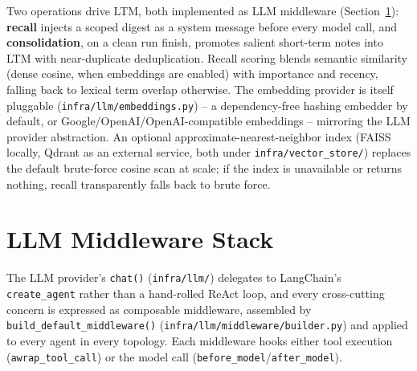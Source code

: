 \documentclass[conference]{IEEEtran}
\begin{document}
Two operations drive LTM, both implemented as LLM middleware
(Section~\ref{sec:middleware}): \textbf{recall} injects a scoped digest as
a system message before every model call, and \textbf{consolidation}, on a
clean run finish, promotes salient short-term notes into LTM with
near-duplicate deduplication. Recall scoring blends semantic similarity
(dense cosine, when embeddings are enabled) with importance and
recency, falling back to lexical term overlap otherwise. The embedding
provider is itself pluggable (\texttt{infra/llm/embeddings.py}) -- a
dependency-free hashing embedder by default, or Google/OpenAI/OpenAI-compatible
embeddings -- mirroring the LLM provider abstraction. An optional
approximate-nearest-neighbor index (FAISS locally, Qdrant as an external
service, both under \texttt{infra/vector\_store/}) replaces the default
brute-force cosine scan at scale; if the index is unavailable or returns
nothing, recall transparently falls back to brute force.

\section{LLM Middleware Stack}
\label{sec:middleware}

The LLM provider's \texttt{chat()} (\texttt{infra/llm/}) delegates to
LangChain's \texttt{create\_agent} rather than a hand-rolled ReAct loop,
and every cross-cutting concern is expressed as composable middleware,
assembled by \texttt{build\_default\_middleware()}
(\texttt{infra/llm/middleware/builder.py}) and applied to every agent in
every topology. Each middleware hooks either tool execution
(\texttt{awrap\_tool\_call}) or the model call
(\texttt{before\_model}/\texttt{after\_model}).
\end{document}
